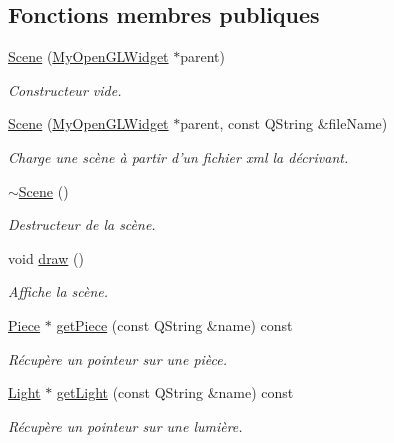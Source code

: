 \subsection*{Fonctions membres publiques}
\begin{DoxyCompactItemize}
\item 
\hyperlink{class_scene_a3c45f1dd8cd92ade623deca326197931}{Scene} (\hyperlink{class_my_open_g_l_widget}{My\+Open\+G\+L\+Widget} $\ast$parent)
\begin{DoxyCompactList}\small\item\em Constructeur vide. \end{DoxyCompactList}\item 
\hyperlink{class_scene_a2490795fc196c0e9f9196d18d4c6cfe0}{Scene} (\hyperlink{class_my_open_g_l_widget}{My\+Open\+G\+L\+Widget} $\ast$parent, const Q\+String \&file\+Name)
\begin{DoxyCompactList}\small\item\em Charge une scène à partir d'un fichier xml la décrivant. \end{DoxyCompactList}\item 
\hyperlink{class_scene_a3b8cec2e32546713915f8c6303c951f1}{$\sim$\+Scene} ()
\begin{DoxyCompactList}\small\item\em Destructeur de la scène. \end{DoxyCompactList}\item 
void \hyperlink{class_scene_ac0e3d2c98ba6063a086467fb2c19142f}{draw} ()
\begin{DoxyCompactList}\small\item\em Affiche la scène. \end{DoxyCompactList}\item 
\hyperlink{class_piece}{Piece} $\ast$ \hyperlink{class_scene_ae2060bd6c44231ffe7f6f0a3447325f1}{get\+Piece} (const Q\+String \&name) const 
\begin{DoxyCompactList}\small\item\em Récupère un pointeur sur une pièce. \end{DoxyCompactList}\item 
\hyperlink{class_light}{Light} $\ast$ \hyperlink{class_scene_a4f35ca9d308ef5563d9f205904eedbb8}{get\+Light} (const Q\+String \&name) const 
\begin{DoxyCompactList}\small\item\em Récupère un pointeur sur une lumière. \end{DoxyCompactList}\item 

\end{DoxyCompactItemize}
